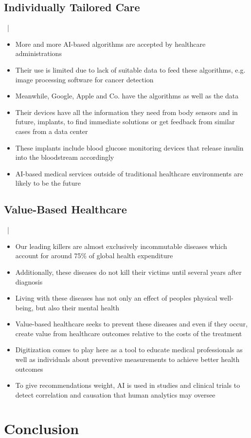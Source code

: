 \documentclass[xcolor=dvipsnames, aspectratio=1610]{beamer}
\begin{document}
\subsection{Individually Tailored Care}%
\label{sub:individually_tailored_care}

\begin{frame}{\secname\ | \subsecname}
    \begin{itemize}[<+->]
        \item More and more AI-based algorithms are accepted by healthcare administrations
        \item Their use is limited due to lack of suitable data to feed these algorithms, e.g. image processing software for cancer detection
        \item Meanwhile, Google, Apple and Co. have the algorithms as well as the data
        \item Their devices have all the information they need from body sensors and in future, implants, to find immediate solutions or get feedback from similar cases from a data center
        \item These implants include blood glucose monitoring devices that release insulin into the bloodstream accordingly
        \item AI-based medical services outside of traditional healthcare environments are likely to be the future
    \end{itemize}
\end{frame}

\subsection{Value-Based Healthcare}%
\label{sub:value_based_healthcare}

\begin{frame}{\secname\ | \subsecname}
    \begin{itemize}
        \item Our leading killers are almost exclusively incommutable diseases which account for around 75\% of global health expenditure
        \item Additionally, these diseases do not kill their victims until several years after diagnosis
        \item Living with these diseases has not only an effect of peoples physical well-being, but also their mental health
        \item Value-based healthcare seeks to prevent these diseases and even if they occur, create value from healthcare outcomes relative to the costs of the treatment
        \item Digitization comes to play here as a tool to educate medical professionals as well as individuals about preventive measurements to achieve better health outcomes
        \item To give recommendations weight, AI is used in studies and clinical trials to detect correlation and causation that human analytics may oversee
    \end{itemize}
\end{frame}

\section{Conclusion}%
\label{sec:conclusion}

\end{document}
